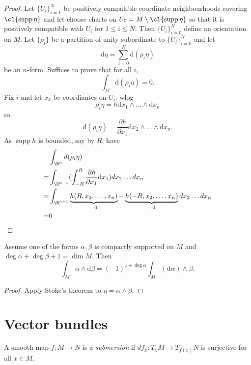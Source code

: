 \documentclass[a4paper]{article}
\DeclareMathOperator{\supp}{supp} %
\newcommand{\w}{\wedge}
\begin{document}
\begin{proof}
  Let \(\{U_i\}_{i = 1}^N\) be positively compatible coordinate neighbourhoods covering \(\cl{\supp \eta}\) and let choose charts on \(U_0 = M \setminus \cl{\supp \eta}\) so that it is positively compatible with \(U_i\) for \(1 \leq i \leq N\). Then \(\{U_i\}_{i = 0}^N\) define an orientation on \(M\). Let \(\{\rho_i\}\) be a partition of unity subordinate to \(\{U_i\}_{i = 0}^N\) and let
  \[
    \mathrm d \eta = \sum_{i = 0}^N \mathrm d(\rho_i \eta)
  \]
  be an \(n\)-form. Suffices to prove that for all \(i\),
  \[
    \int_M \mathrm d (\rho_i \eta) = 0.
  \]
  Fix \(i\) and let \(x_k\) be coordiantes on \(U_i\). wlog
  \[
    \rho_i \eta = h \mathrm dx_1 \w \dots \w \mathrm dx_n
  \]
  so
  \[
    \mathrm d(\rho_i \eta) = \frac{\partial h}{\partial x_1} \mathrm dx_2 \w \dots \w \mathrm dx_n.
  \]
  As \(\supp h\) is bounded, say by \(R\), have
  \begin{align*}
    & \int_{\R^n} d(\rho_i \eta) \\
    =& \int_{\R^{n - 1}} (\int_{-R}^R \frac{\partial h}{\partial x_1} \mathrm dx_1) dx_2 \dots dx_n \\
    =& \int_{\R^{n - 1}} \underbrace{h(R, x_2, \dots, x_n)}_{= 0}- \underbrace{h(-R, x_2, \dots, x_n)}_{= 0} dx_2 \dots dx_n \\
    =& 0
  \end{align*}
\end{proof}

\begin{corollary}
  Assume one of the forms \(\alpha, \beta\) is compactly supported on \(M\) and \(\deg \alpha + \deg \beta + 1 = \dim M\). Then
  \[
    \int_M \alpha \w \mathrm d\beta = (-1)^{1 + \deg \alpha} \int_M (\mathrm d\alpha) \w \beta.
  \]
\end{corollary}

\begin{proof}
  Apply Stoke's theorem to \(\eta = \alpha \w \beta\).
\end{proof}

\section{Vector bundles}

\begin{definition}[submersion]
  A smooth map \(f: M \to N\) is a \emph{submersion} if \(d f_x: T_xM \to T_{f(x)}N\) is surjective for all \(x \in M\).
\end{definition}
\end{document}
